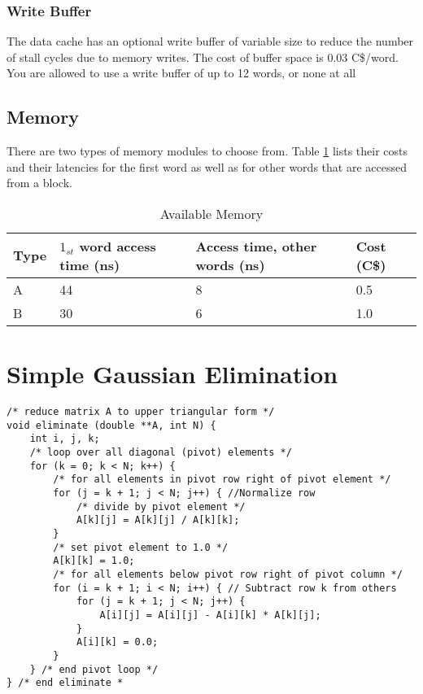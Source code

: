 \subsubsection{Write Buffer}
The data cache has an optional write buffer of variable size to reduce the number of 
stall cycles due to memory writes. 
The cost of buffer space is 0.03 C\$/word. You are allowed to use a write buffer of up 
to 12 words, or none at all



\subsection{Memory}
There are two types of memory modules to choose from. Table \ref{memory_table} lists their 
costs and their latencies for the first word as well as for other words that are accessed 
from a block. 
\begin{table}[H]
	\centering
	\begin{tabular}{|l|l|l|l|} \hline
        Type & $1_{st}$ word access time (ns) & Access time, other words (ns) & Cost (C\$) \\ \hline\hline
        A	& 44	& 8	& 0.5        \\ \hline
        B	& 30	& 6	& 1.0        \\ \hline
	\end{tabular}
	\caption{Available Memory}
	\label{memory_table}
\end{table}

\newpage
\section{Simple Gaussian Elimination}
\label{sec:gaussian_elim_c_code}
\begin{verbatim}
/* reduce matrix A to upper triangular form */
void eliminate (double **A, int N) { 
    int i, j, k; 
    /* loop over all diagonal (pivot) elements */ 
    for (k = 0; k < N; k++) { 
        /* for all elements in pivot row right of pivot element */ 
        for (j = k + 1; j < N; j++) { //Normalize row
            /* divide by pivot element */
            A[k][j] = A[k][j] / A[k][k];
        } 
        /* set pivot element to 1.0 */
        A[k][k] = 1.0; 
        /* for all elements below pivot row right of pivot column */ 
        for (i = k + 1; i < N; i++) { // Subtract row k from others
            for (j = k + 1; j < N; j++) {
                A[i][j] = A[i][j] - A[i][k] * A[k][j];
            }
            A[i][k] = 0.0; 
        }
    } /* end pivot loop */
} /* end eliminate *
\end{verbatim}

